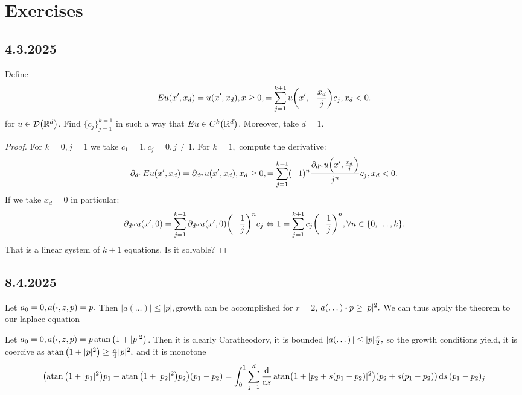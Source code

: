 \documentclass{article}
\begin{document}
\section{Exercises}
\label{sec:exercises}

\subsection{4.3.2025}
\label{sec:43}

\begin{example}
Define
\[
	Eu(x',x_d) = u(x',x_d), x \geq 0, = \sum_{j=1}^{k+1}u\qty(x',-\frac{x_d}{j})c_j, x_d<0.
\]
for $u \in \mathcal{D}\qty({\mathbb R}^d)$. Find $\{c_j\}_{j=1}^{k=1}$ in such a way that $Eu \in C^k\qty({\mathbb R}^d)$. Moreover, take $d=1$.
\end{example}
\begin{proof}
 For $k=0, j=1$ we take $c_1=1, c_j=0, j \neq 1$. For $k=1,$ compute the derivative:
\[
	\partial_{d^n}E u(x',x_d) = \partial_{d^n}u(x',x_d), x_d \geq 0, =\sum_{j=1}^{k=1}(-1)^n\frac{\partial_{d^n}u\qty(x',\frac{x_d}{j})}{j^n}c_j, x_d <0.
\]
If we take $x_d=0$ in particular:
\[
	\partial_{d^n}u\qty(x',0)= \sum_{j=1}^{k+1}\partial_{d^n}u\qty(x',0)\qty(-\frac{1}{j})^n c_j \Leftrightarrow 1 = \sum_{j=1}^{k+1}c_j \qty(-\frac{1}{j})^n, \forall n \in \{0,\dots,k\}.
\]
  That is a linear system of $k+1$ equations. Is it solvable?
\end{proof}

\subsection{8.4.2025}
\label{sec:8.4.2025}

\begin{example}[Laplace]
    Let $a_0=0, a\qty(\vdot, z, p) = p.$ Then $|a(\dots)| \leq |p|, $growth can be accomplished for $r=2$, $a(\dots) \vdot p \geq |p|^{2}.$ We can thus apply the theorem to our laplace equation
\end{example}

\begin{example}
	Let $a_0 = 0, a\qty(\vdot, z, p) = p \atan\qty(1+|p|^{2})$. Then it is clearly Caratheodory, it is bounded $|a\qty(\dots)| \leq |p| \frac{\pi}{2},$ so the growth conditions yield, it is coercive as $ \atan\qty(1+|p|^{2})\geq \frac{\pi}{4}|p|^{2},$ and it is monotone
	\[
		\qty(\atan\qty(1+|p_1|^{2})p_1 - \atan\qty(1+|p_2|^{2})p_2)(p_1 - p_2) = \int_0^1 \sum_{j=1}^d\dv{s} \atan(1+|p_2 +s(p_1-p_2)|^{2})(p_2 + s(p_1-p_2))\dd{s} (p_1 - p_2)_j
	\]
\end{example}
\end{document}

